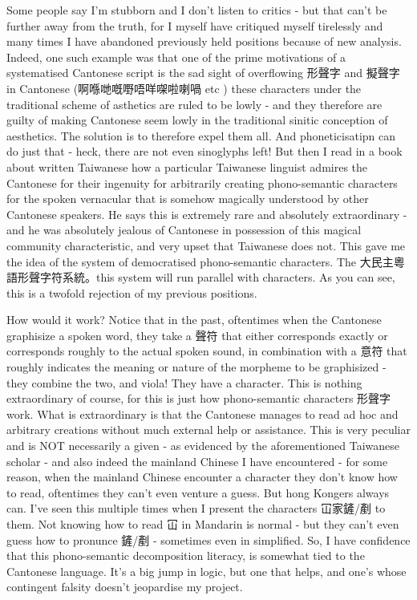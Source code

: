 Some people say I'm stubborn and I don't listen to critics - but that can't be further away from the truth, for I myself have critiqued myself tirelessly and many times I have abandoned previously held positions because of new analysis. Indeed, one such example was that one of the prime motivations of a systematised Cantonese script is the sad sight of overflowing 形聲字 and 擬聲字 in Cantonese (啊喺哋嘅嘢唔咩㗎啦喇喎 etc ) these characters under the traditional scheme of asthetics are ruled to be lowly - and they therefore are guilty of making Cantonese seem lowly in the traditional sinitic conception of aesthetics. The solution is to therefore expel them all. And phoneticisatipn can do just that - heck, there are not even sinoglyphs left! But then I read in a book about written Taiwanese how a particular Taiwanese linguist admires the Cantonese for their ingenuity for arbitrarily creating phono-semantic characters for the spoken vernacular that is somehow magically understood by other Cantonese speakers. He says this is extremely rare and absolutely extraordinary - and he was absolutely jealous of Cantonese in possession of this magical community characteristic, and very upset that Taiwanese does not. This gave me the idea of the system of democratised phono-semantic characters. The 大民主粵語形聲字符系統。this system will run parallel with characters. As you can see, this is a twofold rejection of my previous positions.


How would it work? Notice that in the past, oftentimes when the Cantonese graphisize a spoken word, they take a 聲符 that either corresponds exactly or corresponds roughly to the actual spoken sound, in combination with a 意符 that roughly indicates the meaning or nature of the morpheme to be graphisized - they combine the two, and viola! They have a character.          This is nothing extraordinary of course, for this is just how phono-semantic characters 形聲字 work. What is extraordinary is that the Cantonese manages to read ad hoc and arbitrary creations without much external help or assistance. This is very peculiar and is NOT necessarily a given - as evidenced by the aforementioned Taiwanese scholar - and also indeed the mainland Chinese I have encountered - for some reason, when the mainland Chinese encounter a character they don't know how to read, oftentimes they can't even venture a guess. But hong Kongers always can. I've seen this multiple times when I present the characters 冚家鏟/剷 to them. Not knowing how to read 冚 in Mandarin is normal - but they can't even guess how to pronunce 鏟/剷 - sometimes even in simplified. So, I have confidence that this phono-semantic decomposition literacy, is somewhat tied to the Cantonese language. It's a big jump in logic, but one that helps, and one's whose contingent falsity doesn't jeopardise my project.

